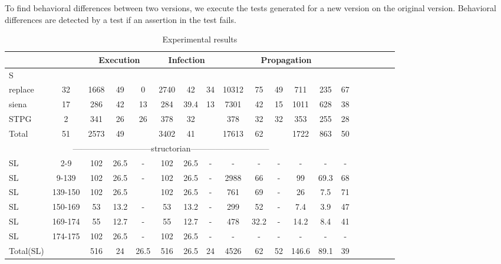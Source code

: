 To find behavioral differences between two versions, we execute the tests generated for a new version on the original version.
Behavioral differences are detected by a test if an assertion in the test fails. 
  

\begin{table*}
\begin{CodeOut}
\begin{center}
\caption {\label{table:all_results}\scriptsize{Experimental results}}
\begin {tabular} {|l|c|c|c|c|c|c|c|c|c|c|c|c|c|c|c|c|c|c|}
\hline
&&\multicolumn{3}{|c|}{Execution}&\multicolumn{3}{|c|}{Infection}&\multicolumn{6}{|c|}{Propagation}\\ 
\hline
S &\CenterCell{V} &\CenterCell{$E_{\CodeIn{Pex}}$}&\CenterCell{$E_{Red}(\%)$}
&\CenterCell{$M_i$}
&\CenterCell{$I_{\CodeIn{Pex}}$}&\CenterCell{$I_{Red}(\%)$}
&\CenterCell{$M_e$}
&\CenterCell{$P_{\CodeIn{Pex}}$}&\CenterCell{$P_{Red}(\%)$}
&\CenterCell{$M_p$}
&\CenterCell{$Tp_{\CodeIn{Pex}}$}&\CenterCell{$Ts$+ $T_d$}&\CenterCell{$Tp_{Red}(\%)$}
\\

\hline
replace	&32		&	1668	&	49		&		0	 &2740	&42		  &34			&		10312	&	75	&	49		&		711	& 235	&		67	 \\ \hline
siena		&17		&286		&42			&		13 &284	&39.4		&13				&		7301	&	42	&	15	&		1011	& 628&	38			\\ \hline
STPG		&2		&341		&26			&	26		 &378	&32			&					&		378		&	32	&	32		&		353	&	255	& 28\\ \hline
Total		&51		&2573		&49		 &			 &3402	&41		&					&		17613	&	62		&			&		1722	&		863	& 50\\
\hline
\multicolumn{13}{|c|}{-----------------------------structorian-----------------------------}&\\
\hline
SL&2-9		&102			&26.5				&		-			&	102				&26.5					&			-			&			-		&		-	&		-		&	-	&	-	&-\\
\hline
SL&9-139	&102			&26.5				&		-			&	102				&26.5		  		&			-			&	2988		&66		&		-		&	99	&	69.3	& 68\\
\hline
SL&139-150&102			&26.5				&					& 102				&26.5					&			-			& 761   	&69   &	  -		&	26  &	7.5		&	71\\
\hline
SL&150-169&53				&13.2				&-				&53					&13.2					&			-			& 299			&52		&	-			&	7.4	& 3.9		&	47\\
\hline
SL&169-174&55				&12.7				&-				&55					&12.7					&			-			&	478			&32.2	&	-			&	14.2&	8.4		&	41\\
\hline
SL&174-175&102			&26.5				&-				&102				&26.5					&			-			&			-		&-		&-			&-		&-			&-	\\
\hline
Total(SL)&&516			&24					&26.5 		&516				&26.5						&			24		&4526			&62		&52			&146.6&	89.1	&39\\
\hline
\hline


\end{tabular}
\end{center}
\end{CodeOut}
\end{table*}
